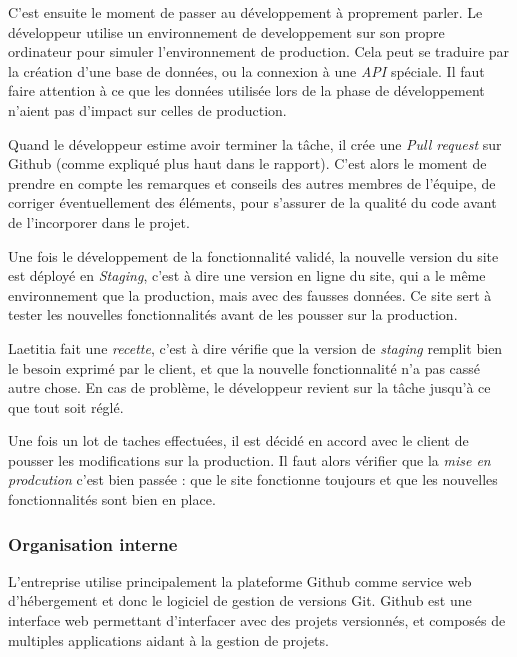 C'est ensuite le moment de passer au développement à proprement parler.
Le développeur utilise un environnement de developpement sur son propre
ordinateur pour simuler l'environnement de production. Cela peut se
traduire par la création d'une base de données, ou la connexion à une
\emph{API} spéciale. Il faut faire attention à ce que les données
utilisée lors de la phase de développement n'aient pas d'impact sur
celles de production.

\bigskip

Quand le développeur estime avoir terminer la tâche, il crée une
\emph{Pull request} sur Github (comme expliqué plus haut dans le
rapport). C'est alors le moment de prendre en compte les remarques et
conseils des autres membres de l'équipe, de corriger éventuellement des
éléments, pour s'assurer de la qualité du code avant de l'incorporer
dans le projet.

\bigskip

Une fois le développement de la fonctionnalité validé, la nouvelle
version du site est déployé en \emph{Staging}, c'est à dire une version
en ligne du site, qui a le même environnement que la production, mais
avec des fausses données. Ce site sert à tester les nouvelles
fonctionnalités avant de les pousser sur la production.

\bigskip

Laetitia fait une \emph{recette}, c'est à dire vérifie que la version de
\emph{staging} remplit bien le besoin exprimé par le client, et que la
nouvelle fonctionnalité n'a pas cassé autre chose. En cas de problème,
le développeur revient sur la tâche jusqu'à ce que tout soit réglé.

\bigskip

Une fois un lot de taches effectuées, il est décidé en accord avec le
client de pousser les modifications sur la production. Il faut alors
vérifier que la \emph{mise en prodcution} c'est bien passée : que le
site fonctionne toujours et que les nouvelles fonctionnalités sont bien
en place.

\newpage

\subsubsection{Organisation interne}\label{organisation-interne}

\bigskip

L'entreprise utilise principalement la plateforme Github comme service
web d'hébergement et donc le logiciel de gestion de versions Git. Github
est une interface web permettant d'interfacer avec des projets
versionnés, et composés de multiples applications aidant à la gestion de
projets.

